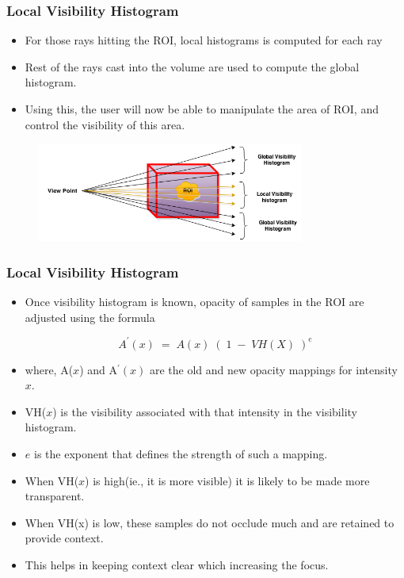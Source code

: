\documentclass{beamer}
\begin{document}


\begin{frame}
\frametitle{Local Visibility Histogram}
\begin{itemize}
\item For those rays hitting the ROI, local histograms is computed for each ray
\item Rest of the rays cast into the volume are used to compute the global
histogram.
\item Using this, the user will now be able to manipulate the area of ROI, and
control the visibility of this area.
\end{itemize}
\begin{figure}
\centering
\includegraphics[width=250pt]{pet-ct-roi.png}
\end{figure}
\end{frame}




\begin{frame}
\frametitle{Local Visibility Histogram}
\begin{itemize}
\item Once visibility histogram is known, opacity of samples in the ROI are adjusted using the formula

\begin{equation} 
A^{'}(x) \; = \; A(x) \; ( \; 1 \; - \; VH(X) \; )^{e} 
\end{equation}

\item where, A($x$) and A$^{'}(x)$ are the old and new opacity mappings for intensity $x$.
\item VH($x$) is the visibility associated with that intensity in the visibility histogram.
\item $e$ is the exponent that defines the strength of such a mapping.
\item When VH($x$) is high(ie., it is more visible) it is likely to be made more transparent. 
\item When VH(x) is low, these samples do not occlude much and are retained to provide context. \\
\item This helps in keeping context clear which increasing the focus. 

\end{itemize}
\end{frame}
\end{document}
